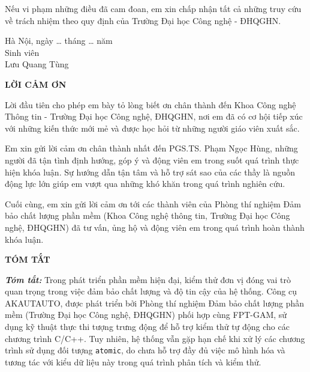 Nếu vi phạm những điều đã cam đoan, em xin chấp nhận tất cả những truy cứu về trách nhiệm theo quy định của Trường Đại
học Công nghệ \@- ĐHQGHN.\@

\begin{flushright}
    \begin{varwidth}{\linewidth}\centering Hà Nội, ngày \ldots{} tháng \ldots{} năm \the\year\\
        Sinh viên\\[2cm]
        Lưu Quang Tùng
    \end{varwidth}
\end{flushright}

\newpage

\begin{center}
    \textbf{LỜI CẢM ƠN}
\end{center}

Lời đầu tiên cho phép em bày tỏ lòng biết ơn chân thành đến Khoa Công nghệ Thông tin \@- Trường Đại học Công nghệ, ĐHQGHN,
nơi em đã có cơ hội tiếp xúc với những kiến thức mới mẻ và được học hỏi từ những người giáo viên xuất sắc.

Em xin gửi lời cảm ơn chân thành nhất đến PGS.TS. Phạm Ngọc Hùng, những người đã tận tình định
hướng, góp ý và động viên em trong suốt quá trình thực hiện khóa luận. Sự hướng dẫn tận tâm và hỗ trợ sát sao của các
thầy là nguồn động lực lớn giúp em vượt qua những khó khăn trong quá trình nghiên cứu.

Cuối cùng, em xin gửi lời cảm ơn tới các thành viên của Phòng thí nghiệm Đảm bảo chất lượng phần mềm (Khoa Công nghệ thông
tin, Trường Đại học Công nghệ, ĐHQGHN) đã tư vấn, ủng hộ và động viên em trong quá trình hoàn thành khóa luận.

\newpage
{}
\begin{center}
    \textbf{TÓM TẮT}
\end{center}
\changefontsizes[16pt]{12pt}

\textit{\textbf{Tóm tắt:}} Trong phát triển phần mềm hiện đại, kiểm thử đơn vị đóng vai trò quan trọng trong việc đảm bảo
chất lượng và độ tin cậy của hệ thống. Công cụ AKAUTAUTO, được phát triển bởi Phòng thí nghiệm Đảm bảo chất lượng phần mềm
(Trường Đại học Công nghệ, ĐHQGHN) phối hợp cùng FPT-GAM, sử dụng kỹ thuật thực thi tượng trưng động để hỗ trợ kiểm thử tự
động cho các chương trình C/C++. Tuy nhiên, hệ thống vẫn gặp hạn chế khi xử lý các chương trình sử dụng đối tượng
\texttt{atomic}, do chưa hỗ trợ đầy đủ việc mô hình hóa và tương tác với kiểu dữ liệu này trong quá trình phân tích và
kiểm thử.

